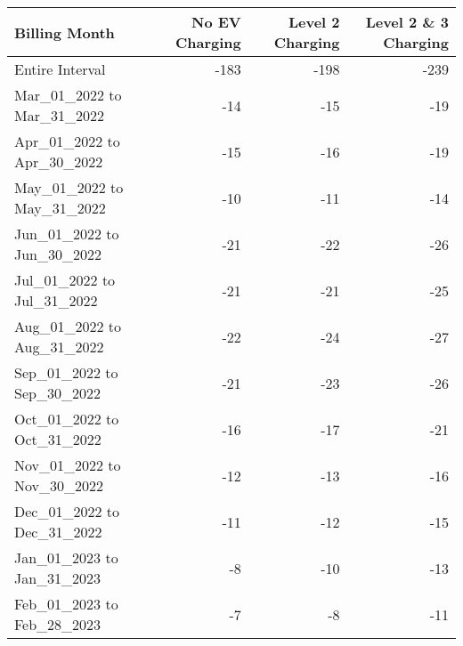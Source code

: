 \begin{tabular}{lrrr}
\toprule
             Billing Month &  No EV Charging &  Level  2 Charging &  Level 2 \& 3 Charging\\
\midrule
           Entire Interval &        -183 &        -198 &        -239  \\
Mar\_01\_2022 to Mar\_31\_2022 &         -14 &         -15 &         -19  \\
Apr\_01\_2022 to Apr\_30\_2022 &         -15 &         -16 &         -19  \\
May\_01\_2022 to May\_31\_2022 &         -10 &         -11 &         -14  \\
Jun\_01\_2022 to Jun\_30\_2022 &         -21 &         -22 &         -26  \\
Jul\_01\_2022 to Jul\_31\_2022 &         -21 &         -21 &         -25 \\
Aug\_01\_2022 to Aug\_31\_2022 &         -22 &         -24 &         -27 \\
Sep\_01\_2022 to Sep\_30\_2022 &         -21 &         -23 &         -26\\
Oct\_01\_2022 to Oct\_31\_2022 &         -16 &         -17 &         -21  \\
Nov\_01\_2022 to Nov\_30\_2022 &         -12 &         -13 &         -16 \\
Dec\_01\_2022 to Dec\_31\_2022 &         -11 &         -12 &         -15  \\
Jan\_01\_2023 to Jan\_31\_2023 &          -8 &         -10 &         -13  \\
Feb\_01\_2023 to Feb\_28\_2023 &          -7 &          -8 &         -11 \\
\bottomrule
\end{tabular}
